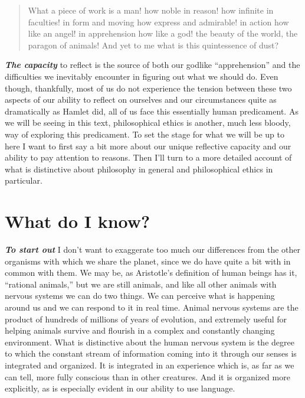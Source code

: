 \documentclass[]{book}
\begin{document}
\begin{quote}
What a piece of work is a man! how noble in reason! how infinite in faculties! in form and moving how express and admirable! in action how like an angel! in apprehension how like a god! the beauty of the world, the paragon of animals! And yet to me what is this quintessence of dust?
\end{quote}

\textbf{\emph{The capacity}} to reflect is the source of both our godlike ``apprehension'' and the difficulties we inevitably encounter in figuring out what we should do. Even though, thankfully, most of us do not experience the tension between these two aspects of our ability to reflect on ourselves and our circumstances quite as dramatically as Hamlet did, all of us face this essentially human predicament. As we will be seeing in this text, philosophical ethics is another, much less bloody, way of exploring this predicament. To set the stage for what we will be up to here I want to first say a bit more about our unique reflective capacity and our ability to pay attention to reasons. Then I'll turn to a more detailed account of what is distinctive about philosophy in general and philosophical ethics in particular.

\hypertarget{what-do-i-know}{%
\section{What do I know?}\label{what-do-i-know}}

\textbf{\emph{To start out}} I don't want to exaggerate too much our differences from the other organisms with which we share the planet, since we do have quite a bit with in common with them. We may be, as Aristotle's definition of human beings has it, ``rational animals,'' but we are still animals, and like all other animals with nervous systems we can do two things. We can perceive what is happening around us and we can respond to it in real time. Animal nervous systems are the product of hundreds of millions of years of evolution, and extremely useful for helping animals survive and flourish in a complex and constantly changing environment. What is distinctive about the human nervous system is the degree to which the constant stream of information coming into it through our senses is integrated and organized. It is integrated in an experience which is, as far as we can tell, more fully conscious than in other creatures. And it is organized more explicitly, as is especially evident in our ability to use language.
\end{document}
